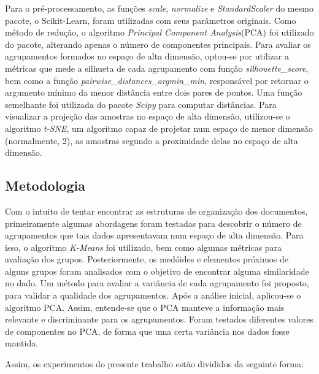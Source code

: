 \documentclass[conference]{IEEEtran}
\begin{document}
Para o pré-processamento, as funções \emph{scale}, \emph{normalize} e \emph{StandardScaler} do mesmo pacote, o Scikit-Learn, foram utilizadas com seus parâmetros originais. Como método de redução, o algoritmo \emph{Principal Component Analysis}(PCA) foi utilizado do pacote, alterando apenas o número de componentes principais. Para avaliar os agrupamentos formados no espaço de alta dimensão, optou-se por utilizar a métricas que mede a silhueta de cada agrupamento com função \emph{silhouette\_score}, bem como a função \emph{pairwise\_distances\_argmin\_min}, responsável por retornar o argumento mínimo da menor distância entre dois pares de pontos. Uma função semelhante foi utilizada do pacote \emph{Scipy} para computar distâncias. Para visualizar a projeção das amostras no espaço de alta dimensão, utilizou-se o algoritmo \emph{t-SNE}, um algoritmo capaz de projetar num espaço de menor dimensão (normalmente, 2), as amostras segundo a proximidade delas no espaço de alta dimensão.


\subsection{Metodologia} \label{sec:met}

Com o intuito de tentar encontrar as estruturas de organização dos documentos, primeiramente algumas abordagens foram testadas para descobrir o número de agrupamentos que tais dados apresentavam num espaço de alta dimensão. Para isso, o algoritmo \emph{K-Means} foi utilizado, bem como algumas métricas para avaliação dos grupos. Posteriormente, os medóides e elementos próximos de alguns grupos foram analisados com o objetivo de encontrar alguma similaridade no dado. Um método para avaliar a variância de cada agrupamento foi proposto, para validar a qualidade dos agrupamentos. Após a análise inicial, aplicou-se o algoritmo PCA. Assim, entende-se que o PCA manteve a informação mais relevante e discriminante para os agrupamentos. Foram testados diferentes valores de componentes no PCA, de forma que uma certa variância nos dados fosse mantida.

Assim, os experimentos do presente trabalho estão divididos da seguinte forma:
\end{document}
